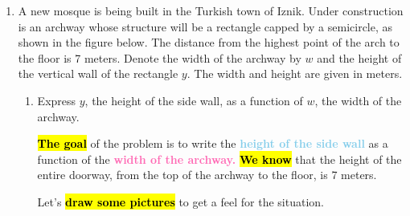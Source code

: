 \documentclass{article}
\newcommand{\goal}[1]{\textbf{\textcolor{skyblue}{#1}}}
\newcommand{\indvar}[1]{\textbf{\textcolor{hotpink}{#1}}}
\begin{document}
\begin{enumerate}
\begin{enumerate}
\begin{solution}
      Putting everything together, we find that $\Delta t_\text{total} = 
      \boxed{\frac{1}{2}\sqrt{(6-h)^2+3^2} + \frac{1}{3}h}$.
    \end{solution}

  \end{enumerate}

\item  %
  \label{prob-1mosquearch} A new mosque is being built in the Turkish
  town of Iznik. Under construction is an archway whose structure will
  be a rectangle capped by a semicircle, as shown in the figure below.
  The distance from the highest point of the arch to the floor is 7
  meters. Denote the width of the archway by $w$ and the height of the
  vertical wall of the rectangle $y$. The width and height are given
  in meters.

  \begin{enumerate}

  \item
    \begin{problem}[\vfill]
      Express $y$, the height of the side wall, as a function of $w$, 
      the width of the archway.
    \end{problem}

    \begin{solution}
      \hl{\textbf{The goal}} of the problem is to write the \goal{height of the side wall} as a function of
      the \indvar{width of the archway.} \hl{\textbf{We know}} that the height of the entire doorway, from the top
      of the archway to the floor, is 7 meters. 

      Let's \hl{\textbf{draw some pictures}} to get a feel for the situation.
      \begin{center}
         \hspace{36pt}
      \end{center}


\end{solution}
\end{enumerate}
\end{enumerate}
\end{document}
